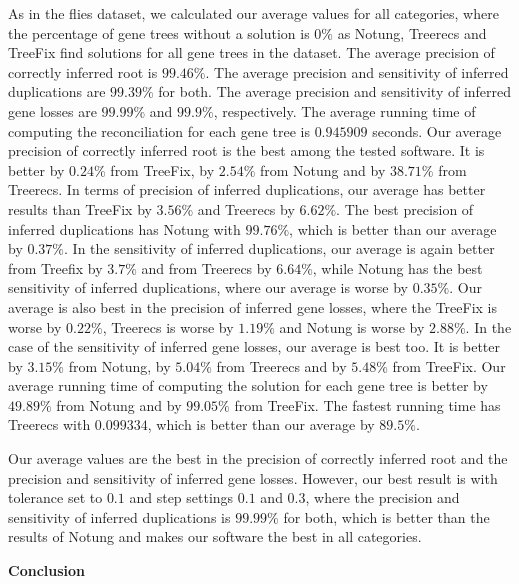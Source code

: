 As in the flies dataset, we calculated our average values for all categories, where the percentage of gene trees without a solution is $0\%$ as Notung, Treerecs and TreeFix find solutions for all gene trees in the dataset. The average precision of correctly inferred root is $99.46\%$. The average precision and sensitivity of inferred duplications are $99.39\%$ for both. The average precision and sensitivity of inferred gene losses are $99.99\%$ and $99.9\%$, respectively. The average running time of computing the reconciliation for each gene tree is $0.945909$ seconds.
Our average precision of correctly inferred root is the best among the tested software. It is better by $0.24\%$ from TreeFix, by $2.54\%$ from Notung and by $38.71\%$ from Treerecs. In terms of precision of inferred duplications, our average has better results than TreeFix by $3.56\%$ and Treerecs by $6.62\%$. The best precision of inferred duplications has Notung with $99.76\%$, which is better than our average by $0.37\%$. In the sensitivity of inferred duplications, our average is again better from Treefix by $3.7\%$ and from Treerecs by $6.64\%$, while Notung has the best sensitivity of inferred duplications, where our average is worse by $0.35\%$. Our average is also best in the precision of inferred gene losses, where the TreeFix is worse by $0.22\%$, Treerecs is worse by $1.19\%$ and Notung is worse by $2.88\%$. In the case of the sensitivity of inferred gene losses, our average is best too. It is better by $3.15\%$ from Notung, by $5.04\%$ from Treerecs and by $5.48\%$ from TreeFix. Our average running time of computing the solution for each gene tree is better by $49.89\%$ from Notung and by $99.05\%$ from TreeFix. The fastest running time has Treerecs with $0.099334$, which is better than our average by $89.5\%$.

Our average values are the best in the precision of correctly inferred root and the precision and sensitivity of inferred gene losses. However, our best result is with tolerance set to $0.1$ and step settings $0.1$ and $0.3$, where the precision and sensitivity of inferred duplications is $99.99\%$ for both, which is better than the results of Notung and makes our software the best in all categories.

\noindent \textbf{Conclusion}

